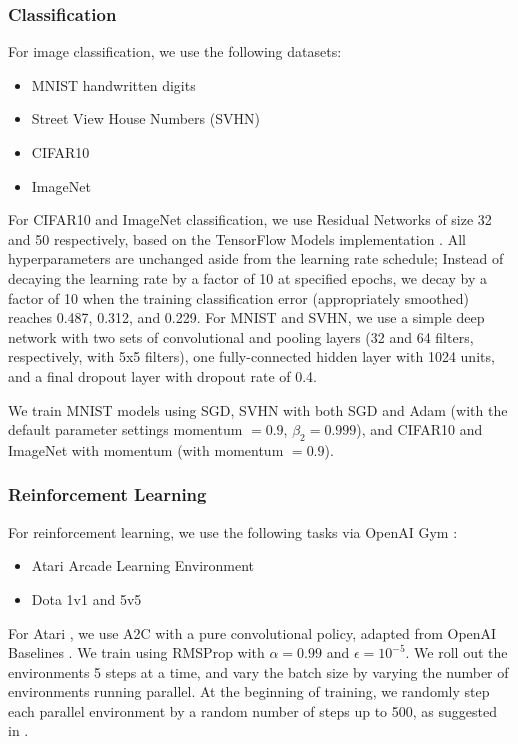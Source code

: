 \documentclass[english]{article}
\begin{document}
\subsubsection{Classification}

For image classification, we use the following datasets:
\begin{itemize}
\item MNIST handwritten digits \cite{lecun-mnisthandwrittendigit-2010}
\item Street View House Numbers (SVHN) \cite{Netzer2011ReadingDI}
\item CIFAR10 \cite{Krizhevsky2009LearningML}
\item ImageNet \cite{imagenet_cvpr09}
\end{itemize}
For CIFAR10 and ImageNet classification, we use Residual Networks \cite{DBLP:journals/corr/HeZRS15} of size 32 and 50 respectively, based on the TensorFlow Models implementation \cite{TF_Official_Resnet}.  All hyperparameters are unchanged aside from the learning rate schedule;  Instead of decaying the learning rate by a factor of 10 at specified epochs, we decay by a factor of 10 when the training classification error (appropriately smoothed) reaches 0.487, 0.312, and 0.229. For MNIST and SVHN, we use a simple deep network with two sets of convolutional and pooling layers (32 and 64 filters, respectively, with 5x5 filters), one fully-connected hidden layer with 1024 units, and a final dropout layer with dropout rate of 0.4.

We train MNIST models using SGD, SVHN with both SGD and Adam \cite{kingma2014adam}  (with the default parameter settings momentum $=0.9$, $\beta_2 = 0.999$), and CIFAR10 and ImageNet with momentum \cite{pmlr-v28-sutskever13} (with momentum $= 0.9$).

\subsubsection{Reinforcement Learning}

For reinforcement learning, we use the following tasks via OpenAI Gym \cite{1606.01540}:
\begin{itemize}
\item Atari Arcade Learning Environment \cite{DBLP:journals/corr/abs-1207-4708}
\item Dota 1v1 and 5v5 \cite{OpenAI_Five}
\end{itemize}
For Atari
, we use A2C \cite{DBLP:journals/corr/MnihBMGLHSK16} with a pure convolutional 
policy, adapted from OpenAI Baselines \cite{baselines}.  We train using RMSProp with $\alpha = 0.99$ and $\epsilon = 10^{-5}$. We roll out the environments 5 steps at a time, and vary the batch size by varying the number of environments running parallel. At the beginning of training, we randomly step each parallel environment by a random number of steps up to 500, as suggested in \cite{1803.02811}.
\end{document}
